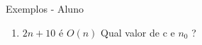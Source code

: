 \documentclass{beamer}
\newcounter{saveenumi}
\newcommand{\seti}{\setcounter{saveenumi}{\value{enumi}}}
\newcommand{\conti}{\setcounter{enumi}{\value{saveenumi}}}
\begin{document}
 \begin{frame}{Exemplos - Aluno}
    \begin{enumerate}
    \conti
     \item $2n+10$ é $O(n)$ Qual valor de c e $n_0$ ?
      \seti
    \end{enumerate}
\end{frame}

%
%
%
%
%
\end{document}
